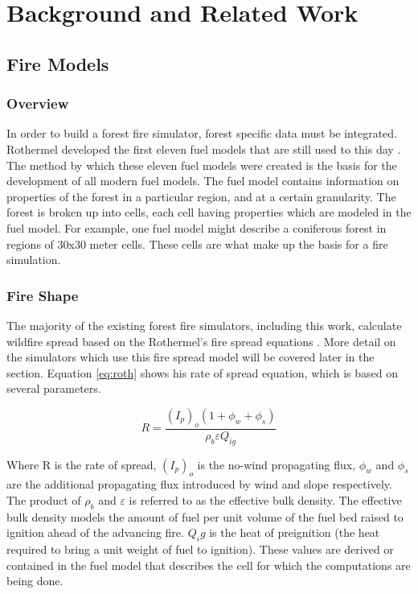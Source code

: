 \chapter{Background and Related Work}
\label{chapter:background}

\section{Fire Models}
\subsection{Overview}
In order to build a forest fire simulator, forest specific data must be integrated. Rothermel developed the first eleven fuel models that are still used to this day \cite{roth}. The method by which these eleven fuel models were created is the basis for the development of all modern fuel models. The fuel model contains information on properties of the forest in a particular region, and at a certain granularity. The forest is broken up into cells, each cell having properties which are modeled in the fuel model. For example, one fuel model might describe a coniferous forest in regions of 30x30 meter cells. These cells are what make up the basis for a fire simulation. 
 

\subsection{Fire Shape}

The majority of the existing forest fire simulators, including this work, calculate wildfire spread based on the Rothermel's fire spread equations \cite{roth}. More detail on the simulators which use this fire spread model will be covered later in the section. Equation \ref{eq:roth} shows his rate of spread equation, which is based on several parameters. 

\begin{equation}
R = \frac{(I_{p})_{o}(1 + \phi_{w} + \phi_{s})}{\rho_{b}\varepsilon Q_{ig}}
\label{eq:roth}
\end{equation}

Where R is the rate of spread, $(I_p)_o$ is the no-wind propagating flux, $\phi_w$ and $\phi_s$ are the additional propagating flux introduced by wind and slope respectively. The product of $\rho_b$ and $\varepsilon$ is referred to as the effective bulk density. The effective bulk density models the amount of fuel per unit volume of the fuel bed raised to ignition ahead of the advancing fire. $Q_ig$ is the heat of preignition (the heat required to bring a unit weight of fuel to ignition). These values are derived or contained in the fuel model that describes the cell for which the computations are being done. 

